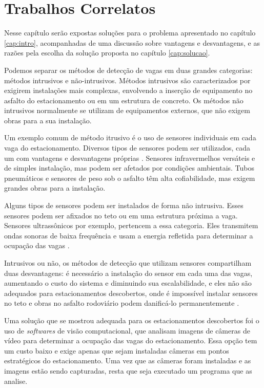 \chapter{Trabalhos Correlatos} \label{cap:trabalhos}

Nesse capítulo serão expostas soluções para o problema apresentado no capítulo \ref{cap:intro}, acompanhadas de uma discussão sobre vantagens e desvantagens, e as razões pela escolha da solução proposta no capítulo \ref{cap:solucao}.

Podemos separar os métodos de detecção de vagas em duas grandes categorias: métodos intrusivos e não-intrusivos. Métodos intrusivos são caracterizados por exigirem instalações mais complexas, envolvendo a inserção de equipamento no asfalto do estacionamento ou em um estrutura de concreto. Os métodos não intrusivos normalmente se utilizam de equipamentos externos, que não exigem obras para a sua instalação.

Um exemplo comum de método itrusivo é o uso de sensores individuais em cada vaga do estacionamento. Diversos tipos de sensores podem ser utilizados, cada um com vantagens e desvantagens próprias \cite{idris09}. Sensores infravermelhos versáteis e de simples instalação, mas podem ser afetados por condições ambientais. Tubos pneumáticos e sensores de peso sob o asfalto têm alta cofiabilidade, mas exigem grandes obras para a instalação. 

Alguns tipos de sensores podem ser instalados de forma não intrusiva. Esses sensores podem ser afixados no teto ou em uma estrutura próxima a vaga. Sensores ultrassônicos por exemplo, pertencem a essa categoria. Eles transmitem ondas sonoras de baixa frequência e usam a energia refletida para determinar a ocupação das vagas \cite{kianpisheh2012smart}.

Intrusivos ou não, os métodos de detecção que utilizam sensores compartilham duas desvantagens: é necessário a instalação do sensor em cada uma das vagas, aumentando o custo do sistema e diminuindo sua escalabilidade, e eles não são adequados para estacionamentos descobertos, onde é impossível instalar sensores no teto e obras no asfalto rodoviário podem danificá-lo permanentemente \cite{idris09}.

Uma solução que se mostrou adequada para os estacionamentos descobertos foi o uso de \textit{softwares} de visão computacional, que analisam imagens de câmeras de vídeo para determinar a ocupação das vagas do estacionamento. Essa opção tem um custo baixo e exige apenas que sejam instaladas câmeras em pontos estratégicos do estacionamento. Uma vez que as câmeras foram instaladas e as imagens estão sendo capturadas, resta que seja executado um programa que as analise.

